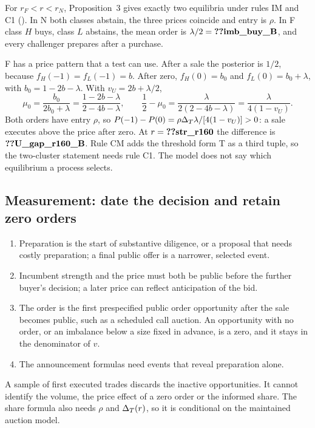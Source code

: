 For \(r_F<r<r_N\), Proposition~3 gives exactly two equilibria under rules IM and C1 ().
In N both classes abstain, the three prices coincide and entry is \(\rho\). In F class \(H\) buys, class \(L\) abstains,
the mean order is \(\lambda/2=\reg{imb_buy_B}\), and every challenger prepares after a purchase.

F has a price pattern that a test can use. After a sale the posterior is \(1/2\), because \(f_H(-1)=f_L(-1)=b\). After zero,
\(f_H(0)=b_0\) and \(f_L(0)=b_0+\lambda\), with \(b_0=1-2b-\lambda\). With \(v_U=2b+\lambda/2\),
\[
\mu_0=\frac{b_0}{2b_0+\lambda}=\frac{1-2b-\lambda}{2-4b-\lambda},\qquad
\frac12-\mu_0=\frac{\lambda}{2(2-4b-\lambda)}=\frac{\lambda}{4(1-v_U)}.
\]
Both orders have entry \(\rho\), so \(P(-1)-P(0)=\rho\Delta_T\lambda/[4(1-v_U)]>0\): a sale executes above the price after
zero. At \(r=\reg{str_r160}\) the difference is \(\reg{U_gap_r160_B}\). Rule CM adds the threshold form T as a third
tuple, so the two-cluster statement needs rule C1. The model does not say which equilibrium a process selects.

\subsection{Measurement: date the decision and retain zero orders}\label{sec:12_empirical-measurement}

\begin{enumerate}[leftmargin=2em]
\item Preparation is the start of substantive diligence, or a proposal that needs costly preparation; a final public
offer is a narrower, selected event.
\item Incumbent strength and the price must both be public before the further buyer's decision; a later price can
reflect anticipation of the bid.
\item The order is the first prespecified public order opportunity after the sale becomes public, such as a scheduled
call auction. An opportunity with no order, or an imbalance below a size fixed in advance, is a zero, and it stays in
the denominator of \(v\).
\item The announcement formulas need events that reveal preparation alone.
\end{enumerate}

\begin{caution}
A sample of first executed trades discards the inactive opportunities. It cannot identify the volume, the price
effect of a zero order or the informed share. The share formula also needs \(\rho\) and \(\Delta_T(r)\), so it is
conditional on the maintained auction model.
\end{caution}
